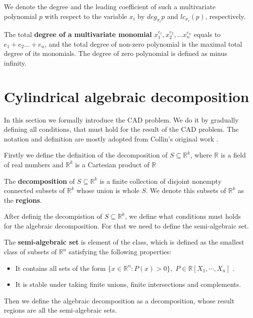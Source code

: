\documentclass[
  digital, %
  twoside, %
  table,   %
  nolof,     %
  nolot,     %
]{fithesis3}
\begin{document}
We denote the degree and the leading coefficient of such a multivariate polynomial $p$ with respect to the variable $x_i$ by $deg_{x_i} p$ and $lc_{x_i}(p)$, respectively. 

The total \textbf{degree of a multivariate monomial} $x_1^{e_1}, x_2^{e_2}, \dots x_n^{e_n}$ equals to  $e_1 + e_2 \dots + e_n$, and the total degree of non-zero polynomial is the maximal total degree of its monomials.\cite{gathen_gerhard_2013} The degree of zero polynomial is defined as minus infinity.

\section{Cylindrical algebraic decomposition}
In this section we formally introduce the CAD problem. We do it by gradually defining all conditions, that must hold for the result of the CAD problem.
 The notation and definition are mostly adopted from Collin's original work .
 
 Firstly we define the definition of the decomposition of $S \subseteq \mathbb{R}^k$, where $\mathbb{R}$ is a field of real numbers and $\mathbb{R}^k$ is a Cartesian product of $\mathbb{R}$
 \begin{definition}
 The \textbf{decomposition} of $S \subseteq\mathbb{R}^k$ is a finite collection of disjoint nonempty connected subsets of $\mathbb{R}^k$ whose union is whole $S$. We denote this subsets of $\mathbb{R}^k$ as the \textbf{regions}. 
\end{definition}
After definig the decompistion of $S \subseteq \mathbb{R}^k$, we define what conditions must holds for the algebraic decomposition. For that we need to define the semi-algebraic set.

\begin{definition}
The \textbf{semi-algebraic set} is element of the class, which is defined as the smallest class of subsets of
$\mathbb{R}^{n}$ satisfying the following properties:
\begin{itemize}
    \item It contains all sets of the form $\{x\in \mathbb{R}^{n}:P(x)>0\},$ $P\in \mathbb{R}[X_{1}, \cdots, X_{n}]$ .
    \item It is stable under taking finite unions, finite intersections and complements.
\end{itemize}
\end{definition}

Then we define the algebraic decomposition as a decomposition, whose result regions are all the semi-algebraic sets. 
\end{document}
